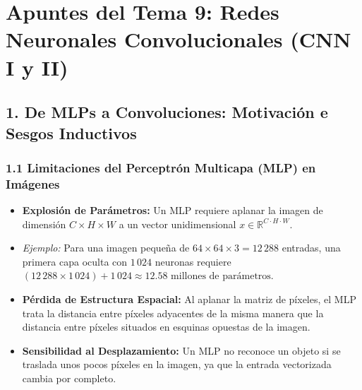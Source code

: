\documentclass[11pt,oneside]{article}
\begin{document}
\tableofcontents
\clearpage
{}
\section{Apuntes del Tema 9: Redes Neuronales Convolucionales (CNN I y II)}

\subsection{1. De MLPs a Convoluciones: Motivación e Sesgos Inductivos}

\subsubsection{1.1 Limitaciones del Perceptrón Multicapa (MLP) en Imágenes}

\begin{itemize}

\item \textbf{Explosión de Parámetros:} Un MLP requiere aplanar la imagen de dimensión \(C \times H \times W\) a un vector unidimensional \(x \in \mathbb{R}^{C \cdot H \cdot W}\).

\end{itemize}

\begin{itemize}

\item \emph{Ejemplo:} Para una imagen pequeña de \(64 \times 64 \times 3 = 12\,288\) entradas, una primera capa oculta con \(1\,024\) neuronas requiere \((12\,288 \times 1\,024) + 1\,024 \approx 12.58 \text{ millones de parámetros}\).

\end{itemize}

\begin{itemize}

\item \textbf{Pérdida de Estructura Espacial:} Al aplanar la matriz de píxeles, el MLP trata la distancia entre píxeles adyacentes de la misma manera que la distancia entre píxeles situados en esquinas opuestas de la imagen.

\end{itemize}

\begin{itemize}

\item \textbf{Sensibilidad al Desplazamiento:} Un MLP no reconoce un objeto si se traslada unos pocos píxeles en la imagen, ya que la entrada vectorizada cambia por completo.

\end{itemize}
\end{document}
